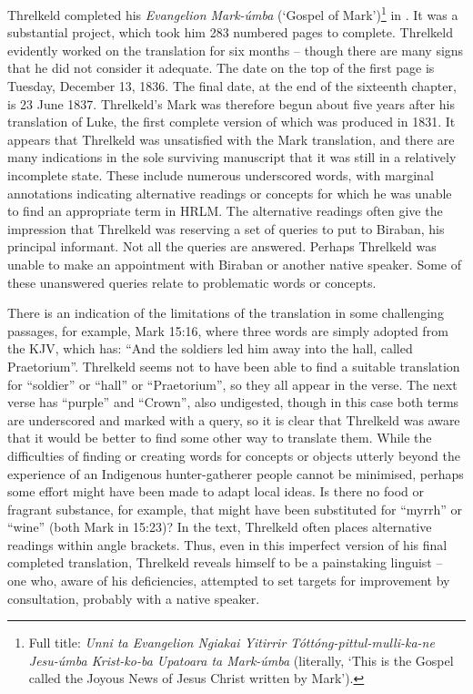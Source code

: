 {Threlkeld completed his \textit{Evangelion Mark-úmba} (‘Gospel of Mark’)\footnote{Full title: \textit{Unni ta Evangelion Ngiakai Yitirrir Tóttóng-pittul-mulli-ka-ne Jesu-úmba Krist-ko-ba Upatoara ta Mark-úmba} (literally, ‘This is the Gospel called the Joyous News of Jesus Christ written by Mark’).} in \citeyear{threlkeld_gospel_1837}. It was a substantial project, which took him 283 numbered pages to complete. Threlkeld evidently worked on the translation for six months -- though there are many signs that he did not consider it adequate. The date on the top of the first page is Tuesday, December 13, 1836. The final date, at the end of the sixteenth chapter, is 23 June 1837. Threlkeld’s Mark was therefore begun about five years after his translation of Luke, the first complete version of which was produced in 1831. It appears that Threlkeld was unsatisfied with the Mark translation, and there are many indications in the sole surviving manuscript that it was still in a relatively incomplete state. These include numerous underscored words, with marginal annotations indicating alternative readings or concepts for which he was unable to find an appropriate term in HRLM. The alternative readings often give the impression that Threlkeld was reserving a set of queries to put to Biraban, his principal informant. Not all the queries are answered. Perhaps Threlkeld was unable to make an appointment with Biraban or another native speaker. Some of these unanswered queries relate to problematic words or concepts.

There is an indication of the limitations of the translation in some challenging passages, for example, Mark 15:16, where three words are simply adopted from the KJV, which has: “And the soldiers led him away into the hall, called Praetorium”. Threlkeld seems not to have been able to find a suitable translation for “soldier” or “hall” or “Praetorium”, so they all appear in the verse. The next verse has “purple” and “Crown”, also undigested, though in this case both terms are underscored and marked with a query, so it is clear that Threlkeld was aware that it would be better to find some other way to translate them. While the difficulties of finding or creating words for concepts or objects utterly beyond the experience of an Indigenous hunter-gatherer people cannot be minimised, perhaps some effort might have been made to adapt local ideas. Is there no food or fragrant substance, for example, that might have been substituted for “myrrh” or “wine” (both Mark in 15:23)? In the text, Threlkeld often places alternative readings within angle brackets. Thus, even in this imperfect version of his final completed translation, Threlkeld reveals himself to be a painstaking linguist -- one who, aware of his deficiencies, attempted to set targets for improvement by consultation, probably with a native speaker.

}

